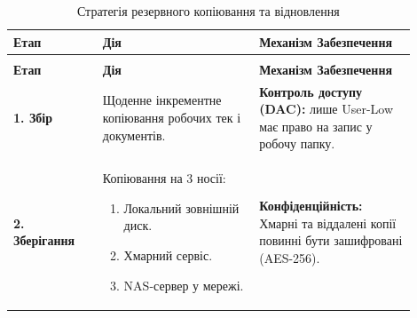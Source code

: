 \begin{longtable}{|
    >{\raggedright\arraybackslash}p{0.2\linewidth}| %
    >{\raggedright\arraybackslash}p{0.35\linewidth}| %
    >{\raggedright\arraybackslash}p{0.35\linewidth}| %
    }

    \caption{Стратегія резервного копіювання та відновлення}
    \label{tab:backup_strategy} \\

    \hline
    \textbf{Етап} & \textbf{Дія} & \textbf{Механізм Забезпечення} \\
    \hline
    \endfirsthead


\multicolumn{3}{r}{{\normalsize Продовження табл. \thetable}} \\
\hline
\textbf{Етап} & \textbf{Дія} & \textbf{Механізм Забезпечення} \\
    \hline
    \endhead

    \hline
    \endlastfoot

    \textbf{1. Збір} & 
    Щоденне інкрементне копіювання робочих тек і документів. & 
    \textbf{Контроль доступу (DAC):} лише User-Low має право на запис у робочу папку. \\
    \hline

    \textbf{2. Зберігання} & 
    \begin{minipage}[t]{\linewidth}
        \vspace{1mm}
        Копіювання на 3 носії:
        \begin{enumerate}
            \item Локальний зовнішній диск.
            \item Хмарний сервіс.
            \item NAS-сервер у мережі.
        \end{enumerate}
        \vspace{1mm}
    \end{minipage} & 
    \begin{minipage}[t]{\linewidth}
        \vspace{1mm}
        \textbf{Конфіденційність:} Хмарні та віддалені копії повинні бути зашифровані (AES-256).
        \vspace{1mm}
    \end{minipage} \\
    \hline


\end{longtable}
